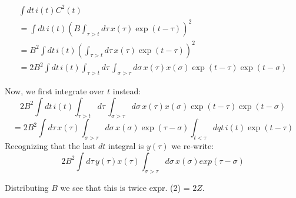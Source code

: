 \documentclass[12pt]{article}
\begin{document}
\begin{eqnarray}
\int{dt\, i(t) C^2(t)}
	\\ = \int{dt\, i(t) \left(
		B \int_{\tau>t}{d\tau\, x(\tau) \exp(t-\tau)}
	\right)^2}
	\\ = B^2 \int{dt\, i(t) \left(
		\int_{\tau>t}{d\tau\, x(\tau) \exp(t-\tau)}
	\right)^2}
	\\ =  2B^2 \int{dt\, i(t) \int_{\tau>t}{d\tau\, \int_{\sigma>\tau}{d\sigma\, x(\tau) x(\sigma) \exp(t-\tau)\exp(t-\sigma)}}}
\end{eqnarray}

Now, we first integrate over $t$ instead:
  $$ 2B^2 \int{dt\, i(t) \int_{\tau>t}{d\tau\, \int_{\sigma>\tau}{d\sigma\, x(\tau) x(\sigma) \exp(t-\tau)\exp(t-\sigma)}}}$$
  $$ = 2B^2 \int{d\tau\, x(\tau) \int_{\sigma > \tau}{d\sigma\, x(\sigma) \exp(\tau-\sigma)\int_{t<\tau}{dqt\, i(t) \exp(t-\tau)}}}$$
Recognizing that the last $dt$ integral is $y(\tau)$ we re-write:
 $$ 2B^2 \int{d\tau\, y(\tau)x(\tau) \int_{\sigma>\tau}{d\sigma\, x(\sigma) exp(\tau-\sigma)}}$$

Distributing $B$ we see that this is twice expr. (2) = $2Z$.




%
\end{document}
